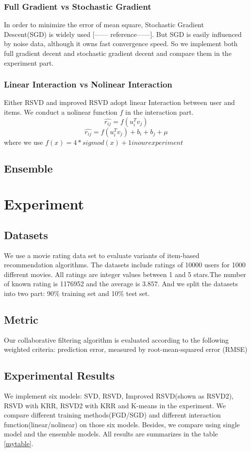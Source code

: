 \documentclass[10pt,conference,compsocconf]{IEEEtran}
\begin{document}
\subsubsection{Full Gradient vs Stochastic Gradient}
In order to minimize the error of mean square, Stochastic Gradient Descent(SGD) is widely used [------ reference------]. But SGD is easily influenced by noise data, although it owns fast convergence speed. So we implement both full gradient decent and stochastic gradient decent and compare them in the experiment part.

\subsubsection{Linear Interaction vs Nolinear Interaction}
Either RSVD and improved RSVD adopt linear Interaction between user and items. We conduct a nolinear function $f$ in the interaction part.
$$ \hat{r_{ij}}=f(u_{i}^{T}v_{j})$$
$$ \hat{r_{ij}}=f(u_{i}^{T}v_{j}) + b_i + b_j  + \mu $$
where we use $f(x) = 4*sigmod(x)+1 in our experiment$
\subsection{Ensemble}



\section{Experiment}
\subsection{Datasets}
We use a movie rating data set to evaluate variants of item-based recommendation algorithms. The datasets include ratings of 10000 users for 1000 different movies. All ratings are integer values between 1 and 5 stars.The number of known rating is 1176952 and the average is $3.857$. And we split the datasets into two part: 90\% training set and 10\% test set.

\subsection{Metric}
Our collaborative filtering algorithm is evaluated according to the following weighted criteria:
prediction error, measured by root-mean-squared error (RMSE)

\subsection{Experimental Results}
We implement six models: SVD, RSVD, Improved RSVD(shown as RSVD2), RSVD with KRR, RSVD2 with KRR and K-means in the experiment. We compare different training methods(FGD/SGD) and different interaction
function(linear/nolinear) on those six models. Besides, we compare using single model and the ensemble models. All results are summarizes in the table \ref{mytable}.
\end{document}
